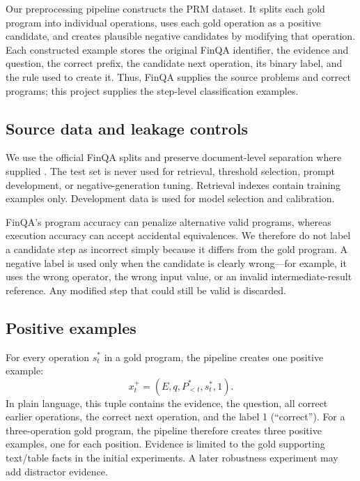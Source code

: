 \documentclass[10pt,twocolumn]{article}
\begin{document}
Our preprocessing pipeline constructs the PRM dataset. It splits each gold program into individual operations, uses each gold operation as a positive candidate, and creates plausible negative candidates by modifying that operation. Each constructed example stores the original FinQA identifier, the evidence and question, the correct prefix, the candidate next operation, its binary label, and the rule used to create it. Thus, FinQA supplies the source problems and correct programs; this project supplies the step-level classification examples.

\subsection{Source data and leakage controls}
We use the official FinQA splits and preserve document-level separation where supplied \citep{finqa2021}. The test set is never used for retrieval, threshold selection, prompt development, or negative-generation tuning. Retrieval indexes contain training examples only. Development data is used for model selection and calibration.

FinQA's program accuracy can penalize alternative valid programs, whereas execution accuracy can accept accidental equivalences. We therefore do not label a candidate step as incorrect simply because it differs from the gold program. A negative label is used only when the candidate is clearly wrong---for example, it uses the wrong operator, the wrong input value, or an invalid intermediate-result reference. Any modified step that could still be valid is discarded.

\subsection{Positive examples}
For every operation $s_t^*$ in a gold program, the pipeline creates one positive example:
\begin{equation}
  x^+_t=(E,q,P^*_{<t},s_t^*,1).
\end{equation}
In plain language, this tuple contains the evidence, the question, all correct earlier operations, the correct next operation, and the label 1 (``correct''). For a three-operation gold program, the pipeline therefore creates three positive examples, one for each position.
Evidence is limited to the gold supporting text/table facts in the initial experiments. A later robustness experiment may add distractor evidence.
\end{document}

